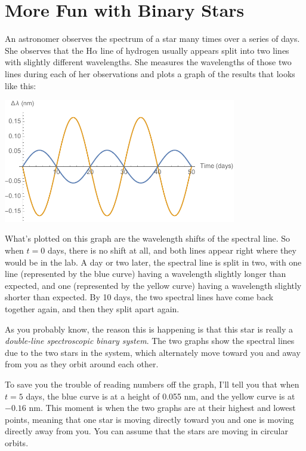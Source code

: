 \section{More Fun with Binary Stars}

\makelabheader

\bigskip

An astronomer observes the spectrum of a star many times over a series of days.
She observes that the H$\alpha$ line of hydrogen usually appears split
into two lines with slightly different wavelengths. She measures
the wavelengths of those two lines during each of her observations
and plots a graph of the results that looks like this:

\vspace{0.1in}
\centerline{\includegraphics[width=4in]{binarycalcs/binary1.pdf}}

What's plotted on this graph are the wavelength shifts of the spectral line.
So when $t=0$ days, there is no shift at all, and both lines appear right
where they would be in the lab. A day or two later, the spectral line is split
in two, with one line (represented by the blue curve) having a wavelength slightly longer than expected, and one (represented by the yellow curve)
having a wavelength slightly shorter than expected. By 10 days, the two
spectral lines have come back together again, and then they split apart again.

As you probably know, the reason this is happening is that this star
is really a \textit{double-line spectroscopic binary system}. The two graphs
show the spectral lines due to the two stars in the system, which alternately
move toward you and away from you as they orbit around each other.

To save you the trouble of reading numbers off the graph, I'll
tell you that when $t=5$ days, the blue curve is at a height of 0.055 nm,
and the yellow curve is at $-0.16$ nm. This moment is when the two graphs
are at their highest and lowest points, meaning that one star is
moving directly toward you and one is moving directly away from you.
You can assume that the stars are moving in circular orbits.


